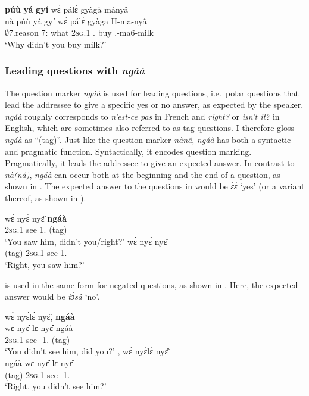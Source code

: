 \ea\label{PQ4}
   {\bfseries púù} {\bfseries yá} {\bfseries gyí} wɛ̀ pálɛ́ gyàgà mányâ \\
         nà púù yá gyí wɛ̀ pálɛ́ gyàga H-ma-nyâ \\
               {\Q} $\emptyset$7.reason 7:{\ATT} what 2\textsc{sg}.{\PST}1 {\NEG}.{\PST} buy {\OBJ}.{\LINK}-ma6-milk\\
    \trans `Why didn't you buy milk?'
\z




\subsubsection{Leading questions with {\itshape ngáà}}
\label{sec:LeadingQ}

The question marker {\itshape ngáà} is used for leading questions, i.e.\ polar questions that lead the addressee to give a specific yes or no answer, as expected by the speaker. {\itshape ngáà} roughly corresponds to {\itshape n'est-ce pas} in French and {\itshape right?} or {\itshape isn't it?} in English, which are sometimes also referred to as tag questions. I therefore gloss {\itshape ngáà} as ``{\Q}(tag)''. Just like the question marker {\itshape nànâ}, {\itshape ngáà} has both a syntactic and pragmatic function. Syntactically, it encodes question marking. Pragmatically, it leads the addressee to give an expected answer. In contrast to {\itshape nà(nâ)}, {\itshape ngáà} can occur both at the beginning and the end of a question, as shown in . The expected answer to the questions in  would be {\itshape ɛ́ɛ̀} `yes' (or a variant thereof, as shown in ).

\ea\label{LQ1}
\ea  \label{LQ1a}
  \gll     wɛ̀ nyɛ́ nyɛ̂ {\bfseries ngáà} \\
               2\textsc{sg}.{\PST}1 see 1.{\OBJ}  {\Q}(tag)\\
    \trans `You saw him, didn't you/right?'
\ex\label{LQ1b}
  wɛ̀ nyɛ́ nyɛ̂  \\
             {\Q}(tag) 2\textsc{sg}.{\PST}1 see 1.{\OBJ}   \\
    \trans `Right, you saw him?'
\z
\z

 is used in the same form for negated questions, as shown in . Here, the expected answer would be {\itshape tɔ̀sâ} `no'.

\ea\label{LQ2}
\ea  \label{LQ2a}
  \glll     wɛ̀ nyɛ́lɛ́ nyɛ̂, {\bfseries ngáà} \\
              wɛ nyɛ̂-lɛ nyɛ̂ ngáà \\
               2\textsc{sg}.{\PST}1 see-{\NEG} 1.{\OBJ} {\Q}(tag) \\
    \trans `You didn't see him, did you?'
\ex\label{LQ2b}
 , wɛ̀ nyɛ́lɛ́ nyɛ̂  \\
          ngáà wɛ nyɛ̂-lɛ nyɛ̂ \\
             {\Q}(tag) 2\textsc{sg}.{\PST}1 see-{\NEG} 1.{\OBJ}  \\
    \trans `Right, you didn't see him?'
\z
\z 


